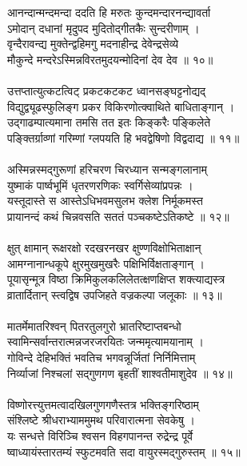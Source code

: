 आनन्दान्मन्दमन्दा ददति हि मरुतः कुन्दमन्दारनन्द्यावर्ता\\
     ऽमोदान् दधानां मृदुपद मुदितोद्गीतकैः सुन्दरीणाम् ।\\
वृन्दैरावन्द्य मुक्तेन्द्वहिमगु मदनाहीन्द्र देवेन्द्रसेव्ये\\
     मौकुन्दे मन्दरेऽस्मिन्नविरतमुदयन्मोदिनां देव देव ॥ १०॥\\
\\
उत्तप्तात्युत्कटत्विट् प्रकटकटकट ध्वानसङ्घट्टनोद्यद्\\
     विद्युद्व्यूढस्फुलिङ्ग प्रकर विकिरणोत्क्वाथिते बाधिताङ्गान् ।\\
उद्गाढम्पात्यमाना तमसि तत इतः किङ्करैः पङ्किलेते\\
     पङ्क्तिर्ग्राव्णां गरिम्णां ग्लपयति हि भवद्वेषिणो विद्वदाद्य ॥ ११॥\\
\\
अस्मिन्नस्मद्गुरूणां हरिचरण चिरध्यान सन्मङ्गलानाम्\\
     युष्माकं  पार्ष्वभूमिं धृतरणरणिकः स्वर्गिसेव्यांप्रपन्नः ।\\
यस्तूदास्ते स आस्तेऽधिभवमसुलभ क्लेश निर्मूकमस्त\\
     प्रायानन्दं कथं चिन्नवसति सततं पञ्चकष्टेऽतिकष्टे ॥ १२॥\\
\\
क्षुत् क्षामान् रूक्षरक्षो रदखरनखर क्षुण्णविक्षोभिताक्षान्\\
     आमग्नानान्धकूपे क्षुरमुखमुखरैः पक्षिभिर्विक्षताङ्गान् ।\\
पूयासृन्मूत्र विष्ठा क्रिमिकुलकलिलेतत्क्षणक्षिप्त शक्त्याद्यस्त्र\\
     व्रातार्दितान् स्त्वद्विष उपजिहते वज्रकल्पा जलूकाः ॥ १३॥\\
\\
मातर्मेमातरिश्वन् पितरतुलगुरो भ्रातरिष्टाप्तबन्धो\\
     स्वामिन्सर्वान्तरात्मन्नजरजरयितः जन्ममृत्यामयानाम् ।\\
गोविन्दे देहिभक्तिं भवतिच भगवन्नूर्जितां निर्निमित्ताम्\\
     निर्व्याजां निश्चलां सद्गुणगण बृहतीं शाश्वतीमाशुदेव ॥ १४॥\\
\\
विष्णोरत्त्युत्तमत्वादखिलगुणगणैस्तत्र भक्तिङ्गरिष्ठाम्\\
     संश्लिष्टे श्रीधराभ्याममुमथ परिवारात्मना सेवकेषु ।\\
यः सन्धत्ते विरिञ्चि श्वसन विहगपानन्त रुद्रेन्द्र पूर्वे\\
     ष्वाध्यायंस्तारतम्यं स्फुटमवति सदा वायुरस्मद्गुरुस्तम् ॥ १५॥\\
